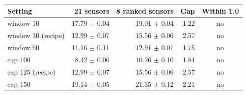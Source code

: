 \begin{tabular}{lrrrc}
\toprule
Setting & 21 sensors & 8 ranked sensors & Gap & Within 1.0 \\
\midrule
window 10 & 17.79 $\pm$ 0.04 & 19.01 $\pm$ 0.04 & 1.22 & no \\
window 30 (recipe) & 12.99 $\pm$ 0.07 & 15.56 $\pm$ 0.06 & 2.57 & no \\
window 60 & 11.16 $\pm$ 0.11 & 12.91 $\pm$ 0.01 & 1.75 & no \\
cap 100 & 8.42 $\pm$ 0.06 & 10.26 $\pm$ 0.10 & 1.84 & no \\
cap 125 (recipe) & 12.99 $\pm$ 0.07 & 15.56 $\pm$ 0.06 & 2.57 & no \\
cap 150 & 19.14 $\pm$ 0.05 & 21.35 $\pm$ 0.12 & 2.21 & no \\
\bottomrule
\end{tabular}

